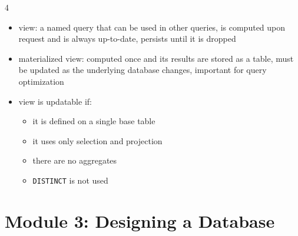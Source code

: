 \documentclass[8pt,landscape]{article}
\begin{document}
\begin{multicols*}{4}
\begin{itemize}[leftmargin=*]
          \item view: a named query that can be used in other queries, is computed upon request and is always up-to-date, persists until it is dropped
          \item materialized view: computed once and its results are stored as a table, must be updated as the underlying database changes, important for query optimization
          \item view is updatable if:
            \begin{itemize}
              \item it is defined on a single base table
              \item it uses only selection and projection
              \item there are no aggregates
              \item \texttt{DISTINCT} is not used
              \end{itemize}
		\end{itemize}

    \section*{Module 3: Designing a Database}
		\begin{itemize}[leftmargin=*]
			\end{itemize}

\end{multicols*}
\end{document}
